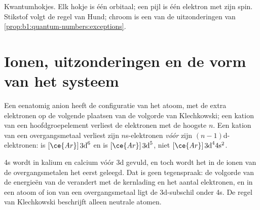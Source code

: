 \begin{omfigure}

{\small Kwantumhokjes. Elk hokje is één orbitaal; een pijl is één
elektron met zijn spin. Stikstof volgt de regel van Hund; chroom is een
van de uitzonderingen van \cref{prop:b1:quantum-numbers:exceptions}.}
\end{omfigure}

\section{Ionen, uitzonderingen en de vorm van het systeem}

\begin{proposition}\label{prop:b1:quantum-numbers:ions}
Een eenatomig anion heeft de configuratie van het atoom, met de extra
elektronen op de volgende plaatsen van de volgorde van Klechkowski; een
kation van een hoofdgroepelement verliest de elektronen met de hoogste
$n$. Een kation van een overgangsmetaal verliest zijn $n$s-elektronen
\emph{vóór} zijn $(n-1)$d-elektronen:  is $[\ce{Ar}]\,3\text{d}^6$
en  is $[\ce{Ar}]\,3\text{d}^5$, niet $[\ce{Ar}]\,3\text{d}^4
4\text{s}^2$.
\end{proposition}
\admitted


\begin{remark}\label{rem:b1:quantum-numbers:order}
4s wordt in kalium en calcium vóór 3d gevuld, en toch wordt het in de
ionen van de overgangsmetalen het eerst geleegd. Dat is geen
tegenspraak: de volgorde van de energieën van de  verandert
met de kernlading en het aantal elektronen, en in een atoom of ion van
een overgangsmetaal ligt de 3d-subschil onder 4s. De regel van
Klechkowski beschrijft alleen neutrale atomen.
\end{remark}


